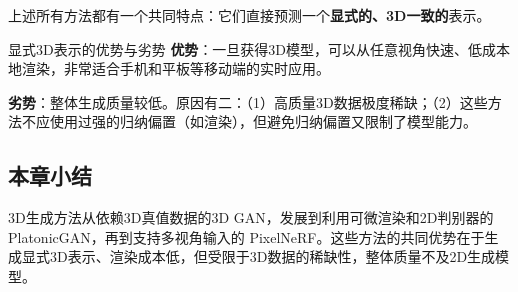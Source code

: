 上述所有方法都有一个共同特点：它们直接预测一个\textbf{显式的、3D一致的}表示。

\begin{importantbox}{显式3D表示的优势与劣势}
\textbf{优势}：一旦获得3D模型，可以从任意视角快速、低成本地渲染，非常适合手机和平板等移动端的实时应用。

\textbf{劣势}：整体生成质量较低。原因有二：（1）高质量3D数据极度稀缺；（2）这些方法不应使用过强的归纳偏置（如渲染），但避免归纳偏置又限制了模型能力。
\end{importantbox}

\subsection{本章小结}

3D生成方法从依赖3D真值数据的3D GAN，发展到利用可微渲染和2D判别器的 PlatonicGAN，再到支持多视角输入的 PixelNeRF。这些方法的共同优势在于生成显式3D表示、渲染成本低，但受限于3D数据的稀缺性，整体质量不及2D生成模型。

